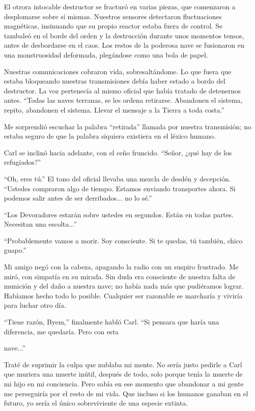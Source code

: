 El otrora intocable destructor se fracturó en varias piezas, que comenzaron a desplomarse sobre sí mismas. Nuestros sensores detectaron fluctuaciones magnéticas, insinuando que su propio reactor estaba fuera de control. Se tambaleó en el borde del orden y la destrucción durante unos momentos tensos, antes de desbordarse en el caos. Los restos de la poderosa nave se fusionaron en una monstruosidad deformada, plegándose como una bola de papel.

Nuestras comunicaciones cobraron vida, sobresaltándome. Lo que fuera que estaba bloqueando nuestras transmisiones debía haber estado a bordo del destructor. La voz pertenecía al mismo oficial que había tratado de detenernos antes. “Todas las naves terranas, se les ordena retirarse. Abandonen el sistema, repito, abandonen el sistema. Llevar el mensaje a la Tierra a toda costa.”

Me sorprendió escuchar la palabra “retirada” llamada por nuestra transmisión; no estaba seguro de que la palabra siquiera existiera en el léxico humano.

Carl se inclinó hacia adelante, con el ceño fruncido. “Señor, ¿qué hay de los refugiados?”

“Oh, eres tú.” El tono del oficial llevaba una mezcla de desdén y decepción. “Ustedes compraron algo de tiempo. Estamos enviando transportes ahora. Si podemos salir antes de ser derribados... no lo sé.”

“Los Devoradores estarán sobre ustedes en segundos. Están en todas partes. Necesitan una escolta...”

“Probablemente vamos a morir. Soy consciente. Si te quedas, tú también, chico guapo.”

Mi amigo negó con la cabeza, apagando la radio con un suspiro frustrado. Me miró, con simpatía en su mirada. Sin duda era consciente de nuestra falta de munición y del daño a nuestra nave; no había nada más que pudiéramos lograr. Habíamos hecho todo lo posible. Cualquier ser razonable se marcharía y viviría para luchar otro día.

“Tiene razón, Byem,” finalmente habló Carl. “Si pensara que haría una diferencia, me quedaría. Pero con esta

nave...”

Traté de suprimir la culpa que nublaba mi mente. No sería justo pedirle a Carl que muriera una muerte inútil, después de todo, solo porque tenía la muerte de mi hijo en mi conciencia. Pero sabía en ese momento que abandonar a mi gente me perseguiría por el resto de mi vida. Que incluso si los humanos ganaban en el futuro, yo sería el único sobreviviente de una especie extinta.

